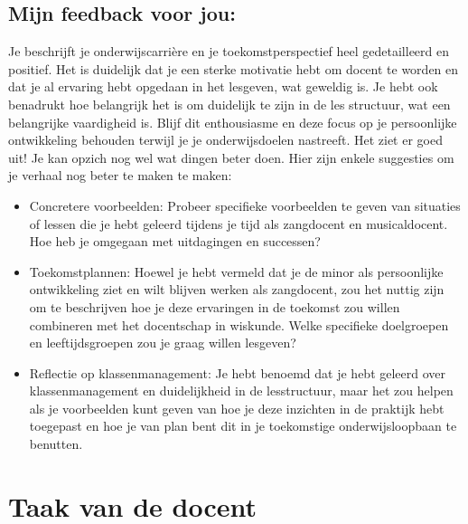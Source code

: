 \documentclass{article}
\begin{document}
        \bigskip

        \subsection*{Mijn feedback voor jou:}
            Je beschrijft je onderwijscarrière en je toekomstperspectief heel gedetailleerd en positief. Het is duidelijk dat je een sterke motivatie hebt om docent te worden en dat je al ervaring hebt opgedaan in het lesgeven, wat geweldig is. Je hebt ook benadrukt hoe belangrijk het is om duidelijk te zijn in de les structuur, wat een belangrijke vaardigheid is. Blijf dit enthousiasme en deze focus op je persoonlijke ontwikkeling behouden terwijl je je onderwijsdoelen nastreeft. Het ziet er goed uit!
            Je kan opzich nog wel wat dingen beter doen. Hier zijn enkele suggesties om je verhaal nog beter te maken te maken:
            \begin{itemize}
                \item Concretere voorbeelden: Probeer specifieke voorbeelden te geven van situaties of lessen die je hebt geleerd tijdens je tijd als zangdocent en musicaldocent. Hoe heb je omgegaan met uitdagingen en successen?
                \item Toekomstplannen: Hoewel je hebt vermeld dat je de minor als persoonlijke ontwikkeling ziet en wilt blijven werken als zangdocent, zou het nuttig zijn om te beschrijven hoe je deze ervaringen in de toekomst zou willen combineren met het docentschap in wiskunde. Welke specifieke doelgroepen en leeftijdsgroepen zou je graag willen lesgeven?
                \item Reflectie op klassenmanagement: Je hebt benoemd dat je hebt geleerd over klassenmanagement en duidelijkheid in de lesstructuur, maar het zou helpen als je voorbeelden kunt geven van hoe je deze inzichten in de praktijk hebt toegepast en hoe je van plan bent dit in je toekomstige onderwijsloopbaan te benutten.
            \end{itemize}
    
    \newpage
    
    \section*{Taak van de docent}
\end{document}

